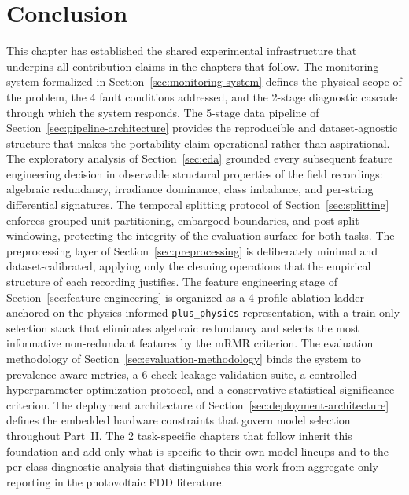 \section{Conclusion}
\label{sec:design-conclusion}

This chapter has established the shared experimental infrastructure that underpins all contribution claims in the chapters that follow. The monitoring system formalized in Section~\ref{sec:monitoring-system} defines the physical scope of the problem, the 4 fault conditions addressed, and the 2-stage diagnostic cascade through which the system responds. The 5-stage data pipeline of Section~\ref{sec:pipeline-architecture} provides the reproducible and dataset-agnostic structure that makes the portability claim operational rather than aspirational. The exploratory analysis of Section~\ref{sec:eda} grounded every subsequent feature engineering decision in observable structural properties of the field recordings: algebraic redundancy, irradiance dominance, class imbalance, and per-string differential signatures. The temporal splitting protocol of Section~\ref{sec:splitting} enforces grouped-unit partitioning, embargoed boundaries, and post-split windowing, protecting the integrity of the evaluation surface for both tasks. The preprocessing layer of Section~\ref{sec:preprocessing} is deliberately minimal and dataset-calibrated, applying only the cleaning operations that the empirical structure of each recording justifies. The feature engineering stage of Section~\ref{sec:feature-engineering} is organized as a 4-profile ablation ladder anchored on the physics-informed \texttt{plus\_physics} representation, with a train-only selection stack that eliminates algebraic redundancy and selects the most informative non-redundant features by the mRMR criterion. The evaluation methodology of Section~\ref{sec:evaluation-methodology} binds the system to prevalence-aware metrics, a 6-check leakage validation suite, a controlled hyperparameter optimization protocol, and a conservative statistical significance criterion. The deployment architecture of Section~\ref{sec:deployment-architecture} defines the embedded hardware constraints that govern model selection throughout Part~II. The 2 task-specific chapters that follow inherit this foundation and add only what is specific to their own model lineups and to the per-class diagnostic analysis that distinguishes this work from aggregate-only reporting in the photovoltaic FDD literature.

